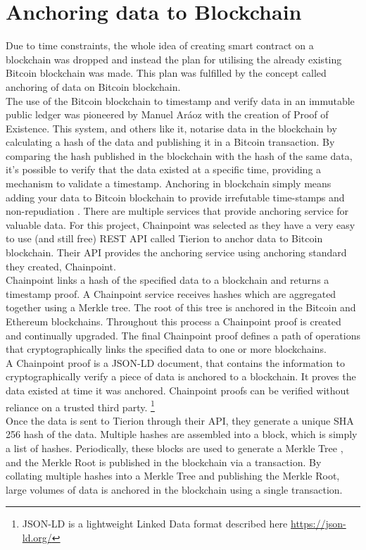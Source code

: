 \section{Anchoring data to Blockchain}
Due to time constraints, the whole idea of creating smart contract on a blockchain was dropped and instead the plan for utilising the already existing Bitcoin blockchain was made. This plan was fulfilled by the concept called anchoring of data on Bitcoin blockchain.
\\The use of the Bitcoin blockchain to timestamp and verify data in an immutable public ledger was pioneered by Manuel Aráoz with the creation of Proof of Existence\cite{Araoz2013ProofExistence}. This system, and others like it, notarise data in the blockchain by calculating a hash of the data and publishing it in a Bitcoin transaction. By comparing the hash published in the blockchain with the hash of the same data, it's possible to verify that the data existed at a specific time, providing a mechanism to validate a timestamp.
Anchoring in blockchain simply means adding your data to Bitcoin blockchain to provide irrefutable time-stamps and non-repudiation \cite{Lemieux2017Blockchain:}. There are multiple services that provide anchoring service for valuable data. For this project, Chainpoint was selected as they have a very easy to use (and still free) REST API called Tierion to anchor data to Bitcoin blockchain. Their API provides the anchoring service using anchoring standard they created, Chainpoint.
\\Chainpoint links a hash of the specified data to a blockchain and returns a timestamp proof. A Chainpoint service receives hashes which are aggregated together using a Merkle tree. The root of this tree is anchored in the Bitcoin and Ethereum blockchains. Throughout this process a Chainpoint proof is created and continually upgraded. The final Chainpoint proof defines a path of operations that cryptographically links the specified data to one or more blockchains.\cite{ChainpointStandard}
\\A Chainpoint proof is a JSON-LD document, that contains the information to cryptographically verify a piece of data is anchored to a blockchain. It proves the data existed at time it was anchored. Chainpoint proofs can be verified without reliance on a trusted third party.
\footnote{JSON-LD is a lightweight Linked Data format described here \url{https://json-ld.org/}}
\\Once the data is sent to Tierion through their API, they generate a unique SHA 256 hash of the data. Multiple hashes are assembled into a block, which is simply a list of hashes. Periodically, these blocks are used to generate a Merkle Tree\cite{Merkle1980ProtocolsCryptosystems} , and the Merkle Root is published in the blockchain via a transaction. By collating multiple hashes into a Merkle Tree and publishing the Merkle Root, large volumes of data is anchored in the blockchain using a single transaction. \cite{Wayne2016Chainpoint:Receipts}

